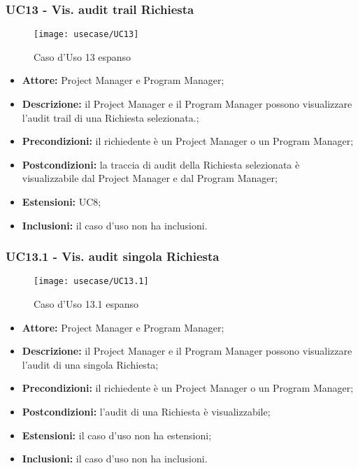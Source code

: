 \subsubsection*{UC13 - Vis. audit trail Richiesta}

\begin{figure}[H] 
    \centering 
    \texttt{[image: usecase/UC13]} 
    \caption{Caso d'Uso 13 espanso}
\end{figure}

\begin{itemize}[label=$\circ$]
\item \textbf{Attore:} Project Manager e Program Manager;
\item \textbf{Descrizione:} il Project Manager e il Program Manager possono visualizzare l'audit trail di una Richiesta selezionata.;
\item \textbf{Precondizioni:} il richiedente è un Project Manager o un Program Manager;
\item \textbf{Postcondizioni:} la traccia di audit della Richiesta selezionata è visualizzabile dal Project Manager e dal Program Manager;
\item \textbf{Estensioni:} UC8;
\item \textbf{Inclusioni:} il caso d'uso non ha inclusioni.
\end{itemize}

\subsubsection*{UC13.1 - Vis. audit singola Richiesta}

\begin{figure}[H] 
    \centering 
    \texttt{[image: usecase/UC13.1]} 
    \caption{Caso d'Uso 13.1 espanso}
\end{figure}

\begin{itemize}[label=$\circ$]
\item \textbf{Attore:} Project Manager e Program Manager;
\item \textbf{Descrizione:} il Project Manager e il Program Manager possono visualizzare l'audit di una singola Richiesta;
\item \textbf{Precondizioni:} il richiedente è un Project Manager o un Program Manager;
\item \textbf{Postcondizioni:} l'audit di una Richiesta è visualizzabile;
\item \textbf{Estensioni:} il caso d'uso non ha estensioni;
\item \textbf{Inclusioni:} il caso d'uso non ha inclusioni.
\end{itemize}

